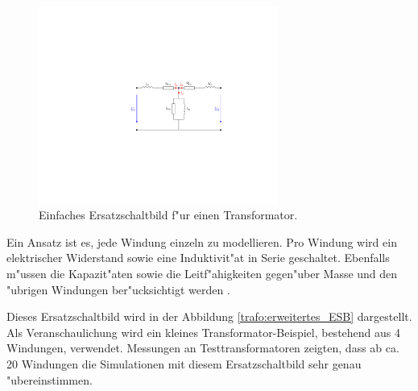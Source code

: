 \begin{refsection}
\begin{figure}
	\centering
	\includegraphics[width=0.7\textwidth]{./trafo/images/Einfaches_ESB.pdf}
	\caption[Einfaches Ersatzschaltbild f"ur einen Transformator]{Einfaches Ersatzschaltbild f"ur einen Transformator.}
	\label{trafo:einfaches_ESB}
\end{figure}

Ein Ansatz ist es, jede Windung einzeln zu modellieren. Pro Windung wird ein elektrischer Widerstand sowie eine Induktivit"at in Serie geschaltet. Ebenfalls m"ussen die Kapazit"aten sowie die Leitf"ahigkeiten gegen"uber Masse und den "ubrigen Windungen ber"ucksichtigt werden \cite{trafo:BILImpulse}. 

Dieses Ersatzschaltbild wird in der Abbildung \ref{trafo:erweitertes_ESB} dargestellt. Als Veranschaulichung wird ein kleines Transformator-Beispiel, bestehend aus 4 Windungen, verwendet. Messungen an Testtransformatoren zeigten, dass ab ca. 20 Windungen die Simulationen mit diesem Ersatzschaltbild sehr genau "ubereinstimmen. 


\end{refsection}
